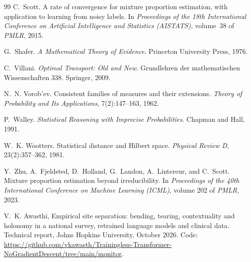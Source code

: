 \documentclass[11pt]{article}
\theoremstyle{definition}
\theoremstyle{remark}
\begin{document}
\begin{thebibliography}{99}
C.~Scott.
\newblock A rate of convergence for mixture proportion estimation, with application to learning from
  noisy labels.
\newblock In \emph{Proceedings of the 18th International Conference on Artificial Intelligence and
  Statistics (AISTATS)}, volume~38 of \emph{PMLR}, 2015.

G.~Shafer.
\newblock \emph{A Mathematical Theory of Evidence}.
\newblock Princeton University Press, 1976.

C.~Villani.
\newblock \emph{Optimal Transport: Old and New}.
\newblock Grundlehren der mathematischen Wissenschaften 338. Springer, 2009.

N.~N. Vorob'ev.
\newblock Consistent families of measures and their extensions.
\newblock \emph{Theory of Probability and Its Applications}, 7(2):147--163, 1962.

P.~Walley.
\newblock \emph{Statistical Reasoning with Imprecise Probabilities}.
\newblock Chapman and Hall, 1991.

W.~K. Wootters.
\newblock Statistical distance and {H}ilbert space.
\newblock \emph{Physical Review D}, 23(2):357--362, 1981.

Y.~Zhu, A.~Fjeldsted, D.~Holland, G.~Landon, A.~Lintereur, and C.~Scott.
\newblock Mixture proportion estimation beyond irreducibility.
\newblock In \emph{Proceedings of the 40th International Conference on Machine Learning (ICML)},
  volume 202 of \emph{PMLR}, 2023.

V.~K. Awasthi, Empirical site separation: bending, tearing, contextuality and holonomy in a national survey, retrained language models and
clinical data. Technical report, Johns Hopkins University, October 2026. Code: \url{https://github.com/vkawasth/Trainingless-Transformer-NoGradientDescent/tree/main/monitor}.

\end{thebibliography}
\end{document}
